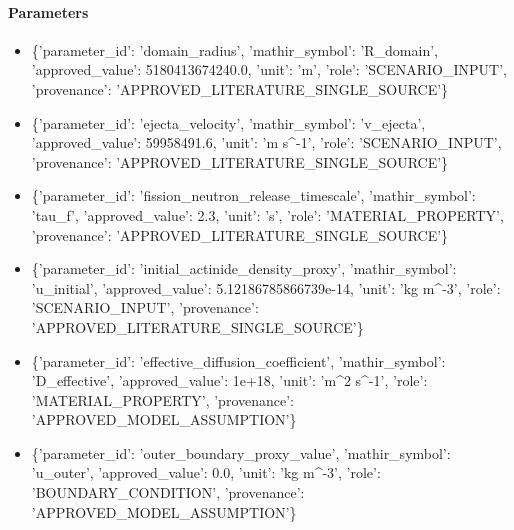 \documentclass[11pt]{article}
\begin{document}
\paragraph{Parameters}
\begin{itemize}\raggedright
\item \{'parameter\_\allowbreak{}id': 'domain\_\allowbreak{}radius', 'mathir\_\allowbreak{}symbol': 'R\_\allowbreak{}domain', 'approved\_\allowbreak{}value': 5180413674240.0, 'unit': 'm', 'role': 'SCENARIO\_\allowbreak{}INPUT', 'provenance': 'APPROVED\_\allowbreak{}LITERATURE\_\allowbreak{}SINGLE\_\allowbreak{}SOURCE'\}
\item \{'parameter\_\allowbreak{}id': 'ejecta\_\allowbreak{}velocity', 'mathir\_\allowbreak{}symbol': 'v\_\allowbreak{}ejecta', 'approved\_\allowbreak{}value': 59958491.6, 'unit': 'm s\textasciicircum{}-1', 'role': 'SCENARIO\_\allowbreak{}INPUT', 'provenance': 'APPROVED\_\allowbreak{}LITERATURE\_\allowbreak{}SINGLE\_\allowbreak{}SOURCE'\}
\item \{'parameter\_\allowbreak{}id': 'fission\_\allowbreak{}neutron\_\allowbreak{}release\_\allowbreak{}timescale', 'mathir\_\allowbreak{}symbol': 'tau\_\allowbreak{}f', 'approved\_\allowbreak{}value': 2.3, 'unit': 's', 'role': 'MATERIAL\_\allowbreak{}PROPERTY', 'provenance': 'APPROVED\_\allowbreak{}LITERATURE\_\allowbreak{}SINGLE\_\allowbreak{}SOURCE'\}
\item \{'parameter\_\allowbreak{}id': 'initial\_\allowbreak{}actinide\_\allowbreak{}density\_\allowbreak{}proxy', 'mathir\_\allowbreak{}symbol': 'u\_\allowbreak{}initial', 'approved\_\allowbreak{}value': 5.12186785866739e-14, 'unit': 'kg m\textasciicircum{}-3', 'role': 'SCENARIO\_\allowbreak{}INPUT', 'provenance': 'APPROVED\_\allowbreak{}LITERATURE\_\allowbreak{}SINGLE\_\allowbreak{}SOURCE'\}
\item \{'parameter\_\allowbreak{}id': 'effective\_\allowbreak{}diffusion\_\allowbreak{}coefficient', 'mathir\_\allowbreak{}symbol': 'D\_\allowbreak{}effective', 'approved\_\allowbreak{}value': 1e+18, 'unit': 'm\textasciicircum{}2 s\textasciicircum{}-1', 'role': 'MATERIAL\_\allowbreak{}PROPERTY', 'provenance': 'APPROVED\_\allowbreak{}MODEL\_\allowbreak{}ASSUMPTION'\}
\item \{'parameter\_\allowbreak{}id': 'outer\_\allowbreak{}boundary\_\allowbreak{}proxy\_\allowbreak{}value', 'mathir\_\allowbreak{}symbol': 'u\_\allowbreak{}outer', 'approved\_\allowbreak{}value': 0.0, 'unit': 'kg m\textasciicircum{}-3', 'role': 'BOUNDARY\_\allowbreak{}CONDITION', 'provenance': 'APPROVED\_\allowbreak{}MODEL\_\allowbreak{}ASSUMPTION'\}

\end{itemize}
\end{document}
